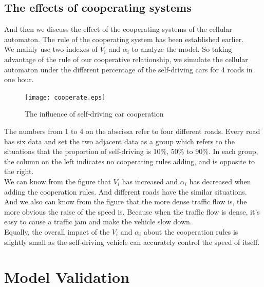 \documentclass[UTF8]{mcmthesis}
\begin{document}
\subsection{The effects of cooperating systems}
And then we discuss the effect of the cooperating systems of the cellular automaton. The rule of the cooperating system has been established earlier. \\
\indent We mainly use two indexes of $V_{i}$ and $\alpha_{i}$ to analyze the model. So taking advantage of the rule of our cooperative relationship, we simulate the cellular automaton under the different percentage of the self-driving cars for 4 roads in one hour. 
\begin{figure}[H]
	\centerline{\texttt{[image: cooperate.eps]}}
	\caption{The influence of self-driving car cooperation}	
\end{figure}
\indent The numbers from 1 to 4 on the abscissa refer to four different roads. Every road has six data and set the two adjacent data as a group which refers to the situations that the proportion of self-driving is 10\%, 50\% to 90\%. In each group, the column on the left indicates no cooperating rules adding, and is opposite to the right.\\
\indent We can know from the figure that $V_{i}$ has increased and $\alpha_{i}$ has decreased when adding the cooperation rules. And different roads have the similar situations.\\
\indent And we also can know from the figure that the more dense traffic flow is, the more obvious the raise of the speed is. Because when the traffic flow is dense, it's easy to cause a traffic jam and make the vehicle slow down.\\
\indent Equally, the overall impact of the $V_{i}$ and $\alpha_{i}$ about the cooperation rules is slightly small as the self-driving vehicle can accurately control the speed of itself.
\section{Model Validation}
\end{document}
